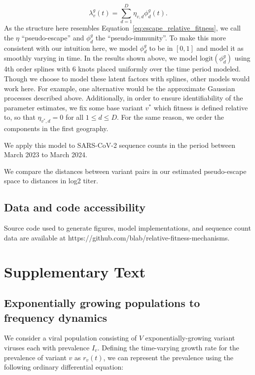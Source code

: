\documentclass[11pt,oneside,letterpaper]{article}
\newcommand{\varEscape}{\eta}
\begin{document}
\begin{equation}
    \lambda_{v}^{g}(t) = \sum_{d=1}^{D} \varEscape_{v,d} \phi_{d}^{g}(t).
\end{equation}
As the structure here resembles Equation~\ref{eq:escape_relative_fitness}, we call the $\varEscape$ ``pseudo-escape'' and $\phi_{d}^{g}$ the ``pseudo-immunity''.
To make this more consistent with our intuition here, we model $\phi_{d}^{g}$ to be in $[0,1]$ and model it as smoothly varying in time.
In the results shown above, we model $\text{logit}(\phi_{d}^{g})$ using 4th order splines with 6 knots placed uniformly over the time period modeled.
Though we choose to model these latent factors with splines, other models would work here.
For example, one alternative would be the approximate Gaussian processes described above.
Additionally, in order to ensure identifiability of the parameter estimates, we fix some base variant $v^*$ which fitness is defined relative to, so that $\varEscape_{v^*, d} = 0$ for all $1\leq d\leq D$.
For the same reason, we order the components in the first geography.

We apply this model to SARS-CoV-2 sequence counts in the period between March 2023 to March 2024.

We compare the distances between variant pairs in our estimated pseudo-escape space to distances in log2 titer.

\subsection*{Data and code accessibility}

Source code used to generate figures, model implementations, and sequence count data are available at https://github.com/blab/relative-fitness-mechanisms.

\newpage

\section*{Supplementary Text}

\subsection{Exponentially growing populations to frequency dynamics}%

We consider a viral population consisting of $V$ exponentially-growing variant viruses each with prevalence $I_{v}$.
Defining the time-varying growth rate for the prevalence of variant $v$ as $r_{v}(t)$, we can represent the prevalence using the following ordinary differential equation:
\end{document}

